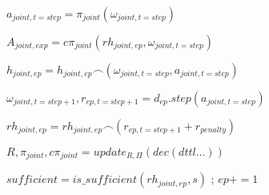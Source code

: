 \begin{algorithm}[h!]
{{    $a_{joint,t=step} = \pi_{joint}(\omega_{joint,t=step})$ 

    $A_{joint,exp} = c\pi_{joint}(rh_{joint,ep}, \omega_{joint,t=step})$ 


    $h_{joint,ep} = h_{joint,ep} \frown (\omega_{joint,t=step}, a_{joint,t=step})$ 

    $\omega_{joint,t=step+1}, r_{ep,t=step+1} = d_{ep}.step(a_{joint,t=step})$ 

    $rh_{joint,ep} = rh_{joint,ep} \frown (r_{ep,t=step+1} + r_{ penalty})$ 

    $R, \pi_{joint}, c\pi_{joint} = update_{R,\Pi}(dec(dttl\dots))$

    }

    $sufficient = is\_sufficient(rh_{joint,ep}, s)$ ; 
    $ep += 1$
    }

\end{algorithm}